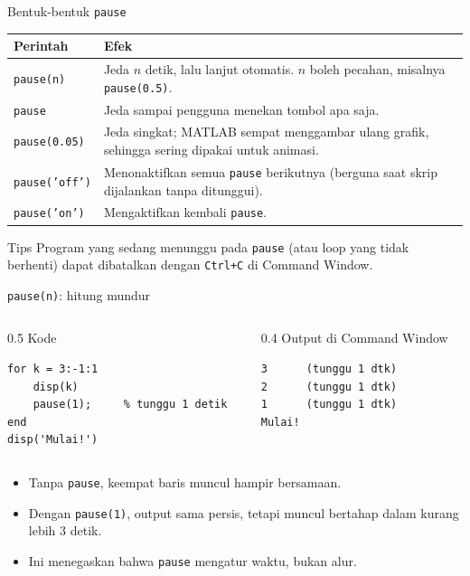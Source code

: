 \documentclass[aspectratio=169,10pt]{beamer}
\newcommand{\kode}[1]{\texttt{#1}}
\newcommand{\labelkode}{{\scriptsize\color{black!60}Kode}}
\newcommand{\labelout}{{\scriptsize\color{alertc}Output di Command Window}}
\begin{document}
\begin{frame}[fragile]{Bentuk-bentuk \kode{pause}}
  \centering
  \small
  \begin{tabular}{@{}l>{\raggedright\arraybackslash}p{}@{}}
    \toprule
    Perintah & Efek \\
    \midrule
    \kode{pause(n)}     & Jeda $n$ detik, lalu lanjut otomatis. $n$ boleh pecahan, misalnya \kode{pause(0.5)}. \\
    \kode{pause}        & Jeda sampai pengguna menekan tombol apa saja. \\
    \kode{pause(0.05)}  & Jeda singkat; MATLAB sempat menggambar ulang grafik, sehingga sering dipakai untuk animasi. \\
    \kode{pause('off')} & Menonaktifkan semua \kode{pause} berikutnya (berguna saat skrip dijalankan tanpa ditunggui). \\
    \kode{pause('on')}  & Mengaktifkan kembali \kode{pause}. \\
    \bottomrule
  \end{tabular}

  \vspace{8pt}
  \normalsize
  \raggedright
  \begin{alertblock}{Tips}
    Program yang sedang menunggu pada \kode{pause} (atau loop yang tidak berhenti) dapat dibatalkan dengan
    \kode{Ctrl+C} di Command Window.
  \end{alertblock}
\end{frame}

\begin{frame}[fragile]{\kode{pause(n)}: hitung mundur}
  \begin{columns}[T]
    \begin{column}{0.5\textwidth}
      \labelkode
\begin{lstlisting}
for k = 3:-1:1
    disp(k)
    pause(1);     % tunggu 1 detik
end
disp('Mulai!')
\end{lstlisting}
    \end{column}
    \begin{column}{0.4\textwidth}
      \labelout
\begin{lstlisting}[style=out]
3      (tunggu 1 dtk)
2      (tunggu 1 dtk)
1      (tunggu 1 dtk)
Mulai!
\end{lstlisting}
    \end{column}
  \end{columns}
  \vspace{8pt}
  \begin{itemize}
    \item Tanpa \kode{pause}, keempat baris muncul hampir bersamaan.
    \item Dengan \kode{pause(1)}, output sama persis, tetapi muncul bertahap dalam kurang lebih 3 detik.
    \item Ini menegaskan bahwa \kode{pause} mengatur \alert{waktu}, bukan \alert{alur}.
  \end{itemize}
\end{frame}
\end{document}
